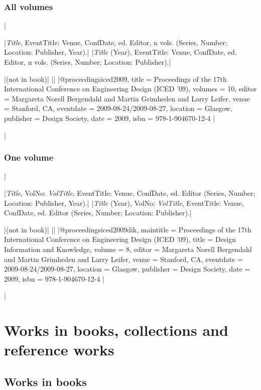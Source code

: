 \documentclass[extrafontsizes,11pt,a4paper,oneside]{memoir}
\newcommand*{\lit}[1]{\textsf{#1}}
\begin{document}
\subsection{All volumes}
|

\specs
|\emph{Title}, EventTitle: Venue, ConfDate, \lit{ed.} Editor, n \lit{vols.} (Series, Number; Location: Publisher, Year).|%
|\emph{Title} (Year), EventTitle: Venue, ConfDate, \lit{ed.} Editor, n \lit{vols.} (Series, Number; Location: Publisher).|

\bibexample
|(not in book)|%
||%
|@proceedings{iced2009,
  title = {Proceedings of the 17th International Conference on Engineering Design (ICED ’09)},
  volumes = {10},
  editor = {Margareta Norell Bergendahl and Martin Grimheden and Larry Leifer},
  venue = {Stanford, CA},
  eventdate = {2009-08-24/2009-08-27},
  location = {Glasgow},
  publisher = {Design Society},
  date = {2009},
  isbn = {978-1-904670-12-4}
}|

\todoc|
\subsection{One volume}
|

\specs
|\emph{Title}, VolNo: \emph{VolTitle}, EventTitle: Venue, ConfDate, \lit{ed.} Editor (Series, Number; Location: Publisher, Year).|%
|\emph{Title} (Year), VolNo: \emph{VolTitle}, EventTitle: Venue, ConfDate, \lit{ed.} Editor (Series, Number; Location: Publisher).|

\bibexample
|(not in book)|%
||%
|@proceedings{iced2009dik,
  maintitle = {Proceedings of the 17th International Conference on Engineering Design (ICED ’09)},
  title = {Design Information and Knowledge},
  volume = {8},
  editor = {Margareta Norell Bergendahl and Martin Grimheden and Larry Leifer},
  venue = {Stanford, CA},
  eventdate = {2009-08-24/2009-08-27},
  location = {Glasgow},
  publisher = {Design Society},
  date = {2009},
  isbn = {978-1-904670-12-4}
}|

\todoc|
\chapter{Works in books, collections and reference works}\label{sec:inx}

\section{Works in books}
\end{document}

